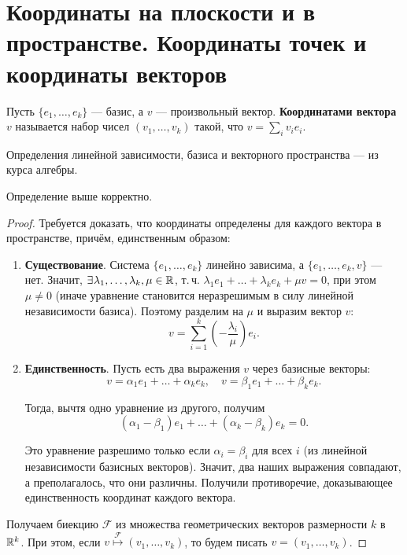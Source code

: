 \section{Координаты на плоскости и в пространстве. Координаты точек и координаты векторов}

\begin{definition}
    Пусть $\{e_1, \ldots, e_k\}$ --- базис, а $v$ --- произвольный вектор. \textbf{Координатами вектора} $v$ называется набор чисел $(v_1, \ldots, v_k)$ такой, что $v = \sum_iv_ie_i$.
\end{definition}

Определения линейной зависимости, базиса и векторного пространства --- из курса алгебры.

\begin{statement}
    Определение выше корректно.
\end{statement}

\begin{proof}
    Требуется доказать, что координаты определены для каждого вектора в пространстве, причём, единственным образом:
    \begin{enumerate}
        \item \textbf{Существование}. Система $\{e_1, \ldots, e_k\}$ линейно зависима, а $\{e_1, \ldots, e_k, v\}$ --- нет. Значит, $\exists\!\:\lambda_1, \ldots, \lambda_k, \mu \in \mathbb{R}$, т.\,ч. $\lambda_1e_1 + \ldots + \lambda_ke_k + \mu v = 0$, при этом $\mu \ne 0$ (иначе уравнение становится неразрешимым в силу линейной независимости базиса). Поэтому разделим на $\mu$ и выразим вектор $v$:
            $$v = \sum_{i = 1}^k\left(-\frac{\lambda_i}{\mu}\right)e_i.$$
        \item \textbf{Единственность}. Пусть есть два выражения $v$ через базисные векторы:
            $$
                v = \alpha_1e_1 + \ldots + \alpha_ke_k,\quad v = \beta_1e_1 + \ldots + \beta_ke_k.
            $$

            Тогда, вычтя одно уравнение из другого, получим
            $$(\alpha_1 - \beta_1)e_1 + \ldots + (\alpha_k - \beta_k)e_k = 0.$$

            Это уравнение разрешимо только если $\alpha_i = \beta_i$ для всех $i$ (из линейной независимости базисных векторов). Значит, два наших выражения совпадают, а преполагалось, что они различны. Получили противоречие, доказывающее единственность координат каждого вектора.
    \end{enumerate}

    Получаем биекцию $\mathcal{F}$ из множества геометрических векторов размерности $k$ в $\mathbb{R}^k$. При этом, если $v \overset{\mathcal{F}}{\mapsto} (v_1, \ldots, v_k)$, то будем писать $v = (v_1, \ldots, v_k)$.
\end{proof}


